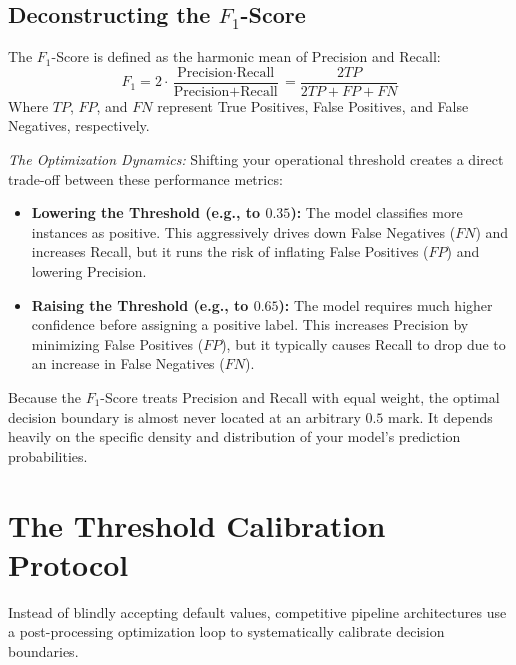 \documentclass{article}
\begin{document}
\subsection{Deconstructing the $F_1$-Score}
The $F_1$-Score is defined as the harmonic mean of Precision and Recall:
\begin{equation}
    F_1 = 2 \cdot \frac{\text{Precision} \cdot \text{Recall}}{\text{Precision} + \text{Recall}} = \frac{2TP}{2TP + FP + FN}
\end{equation}
Where $TP$, $FP$, and $FN$ represent True Positives, False Positives, and False Negatives, respectively.

\textit{The Optimization Dynamics:} Shifting your operational threshold creates a direct trade-off between these performance metrics:
\begin{itemize}
    \item \textbf{Lowering the Threshold (e.g., to $0.35$):} The model classifies more instances as positive. This aggressively drives down False Negatives ($FN$) and increases Recall, but it runs the risk of inflating False Positives ($FP$) and lowering Precision.
    \item \textbf{Raising the Threshold (e.g., to $0.65$):} The model requires much higher confidence before assigning a positive label. This increases Precision by minimizing False Positives ($FP$), but it typically causes Recall to drop due to an increase in False Negatives ($FN$).
\end{itemize}

Because the $F_1$-Score treats Precision and Recall with equal weight, the optimal decision boundary is almost never located at an arbitrary $0.5$ mark. It depends heavily on the specific density and distribution of your model's prediction probabilities.

\section{The Threshold Calibration Protocol}
Instead of blindly accepting default values, competitive pipeline architectures use a post-processing optimization loop to systematically calibrate decision boundaries.
\end{document}
